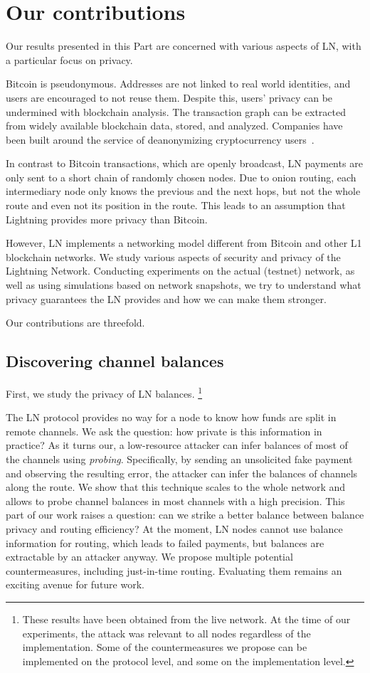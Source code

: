 \section{Our contributions}

Our results presented in this Part are concerned with various aspects of LN, with a particular focus on privacy.

Bitcoin is pseudonymous.
Addresses are not linked to real world identities, and users are encouraged to not reuse them.
Despite this, users' privacy can be undermined with blockchain analysis.
The transaction graph can be extracted from widely available blockchain data, stored, and analyzed.
Companies have been built around the service of deanonymizing cryptocurrency users~\cite{Elliptic, Chainalysis}.

In contrast to Bitcoin transactions, which are openly broadcast, LN payments are only sent to a short chain of randomly chosen nodes.
Due to onion routing, each intermediary node only knows the previous and the next hops, but not the whole route and even not its position in the route.
This leads to an assumption that Lightning provides more privacy than Bitcoin.

However, LN implements a networking model different from Bitcoin and other L1 blockchain networks.
We study various aspects of security and privacy of the Lightning Network.
Conducting experiments on the actual (testnet) network, as well as using simulations based on network snapshots, we try to understand what privacy guarantees the LN provides and how we can make them stronger.

Our contributions are threefold.

\subsection{Discovering channel balances}
First, we study the privacy of LN balances.
\footnote{These results have been obtained from the live network. At the time of our experiments, the attack was relevant to all nodes regardless of the implementation. Some of the countermeasures we propose can be implemented on the protocol level, and some on the implementation level.}

The LN protocol provides no way for a node to know how funds are split in remote channels.
We ask the question: how private is this information in practice?
As it turns our, a low-resource attacker can infer balances of most of the channels using \textit{probing}.
Specifically, by sending an unsolicited fake payment and observing the resulting error, the attacker can infer the balances of channels along the route.
We show that this technique scales to the whole network and allows to probe channel balances in most channels with a high precision.
This part of our work raises a question: can we strike a better balance between balance privacy and routing efficiency?
At the moment, LN nodes cannot use balance information for routing, which leads to failed payments, but balances are extractable by an attacker anyway.
We propose multiple potential countermeasures, including just-in-time routing.
Evaluating them remains an exciting avenue for future work.


